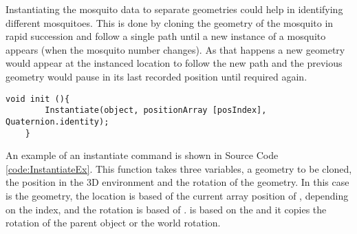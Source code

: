 Instantiating the mosquito data to separate geometries could help in identifying different mosquitoes. This is done by cloning the geometry of the mosquito in rapid succession and follow a single path until a new instance of a mosquito appears (when the mosquito number changes). As that happens a new geometry would appear at the instanced location to follow the new path and the previous geometry would pause in its last recorded position until required again.

\bigskip
\begin{code1}
\begin{verbatim}
void init (){
		Instantiate(object, positionArray [posIndex], Quaternion.identity);
	}
\end{verbatim}
\label{code:InstantiateEx}
\end{code1}

An example of an instantiate command is shown in Source Code \ref{code:InstantiateEx}. This function takes three variables, a geometry to be cloned, the position in the 3D environment and the rotation of the geometry. In  this case  is the geometry, the location is based of the current array position of , depending on the index, and the rotation is based of .  is based on the  and it copies the rotation of the parent object or the world rotation.

